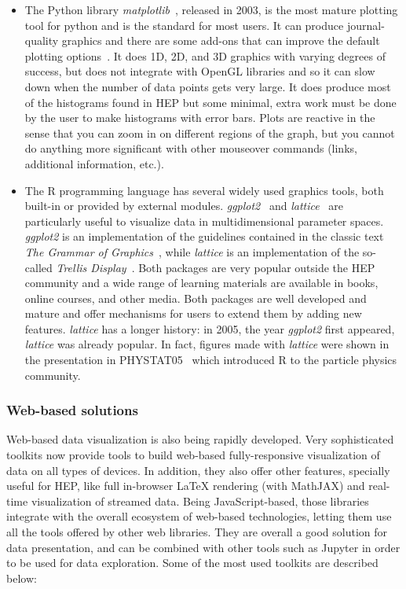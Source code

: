 \documentclass[12pt,a4paper]{article}
\begin{document}
\begin{itemize}
\item The Python library \textit{matplotlib}~\cite{Hunter2007}, released in 2003, is the most mature plotting tool
for python and is the standard for most users. It can produce journal-quality graphics and there are some add-ons
that can improve the default plotting options~\cite{seaborn}. It does 1D, 2D, and 3D graphics with varying degrees
of success, but does not integrate with OpenGL libraries and so it can slow down when the number of data points gets very large.
It does produce most of the histograms found in HEP but some minimal, extra work must be done by the user
to make histograms with error bars. Plots are reactive in the sense that you can zoom in on different regions of the graph,
but you cannot do anything more significant with other mouseover commands (links, additional information, etc.).

\item The R programming language has several widely used graphics tools, both built-in or provided by external modules.
\textit{ggplot2}~\cite{Wickham2009} and \textit{lattice}~\cite{Sarkar2008} are particularly useful to visualize data in
multidimensional parameter spaces. \textit{ggplot2} is an implementation of the guidelines contained in the classic
text \textit{The Grammar of Graphics}~\cite{Wilkinson2005}, while \textit{lattice} is an implementation of the
so-called \textit{Trellis Display}~\cite{Trellis}. Both packages are very popular outside the HEP community and a wide range
of learning materials are available in books, online courses, and other media. Both packages are well developed and mature
and offer mechanisms for users to extend them by adding new features.
\textit{lattice} has a longer history: in 2005, the year \textit{ggplot2} first appeared, \textit{lattice} was already popular.
In fact, figures made with \textit{lattice} were shown in the
presentation in PHYSTAT05~\cite{phystat05} which introduced R to the
particle physics community.
\end{itemize}

\hypertarget{stats-web}{%
\subsubsection{Web-based solutions}\label{stats-web}}

Web-based data visualization is also being rapidly developed. Very sophisticated toolkits now provide tools to build web-based
fully-responsive visualization of data on all types of devices. In addition, they also offer other features, specially useful
for HEP, like full in-browser LaTeX rendering (with MathJAX) and real-time visualization of streamed data. Being JavaScript-based,
those libraries integrate with the overall ecosystem of web-based technologies, letting them use all the tools offered by other
web libraries. They are overall a good solution for data presentation, and can be combined with other tools such as Jupyter
in order to be used for data exploration. Some of the most used toolkits are described below:
\end{document}

